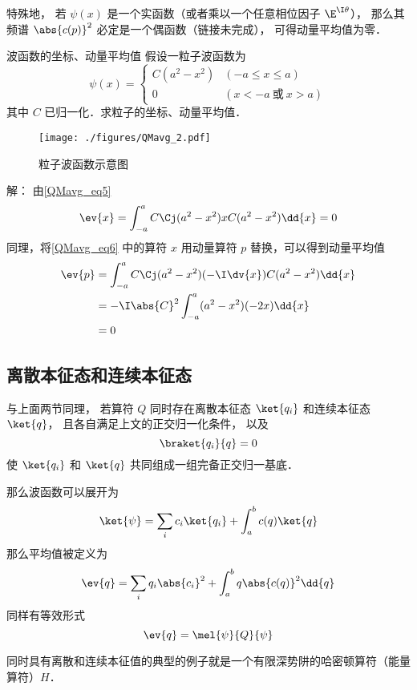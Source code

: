 特殊地， 若 $\psi(x)$ 是一个实函数（或者乘以一个任意相位因子 $\E^{\I \theta}$）， 那么其频谱 $\abs{c(p)}^2$ 必定是一个偶函数（链接未完成）， 可得动量平均值为零．


\begin{example}{波函数的坐标、动量平均值}
假设一粒子波函数为
\begin{equation}
\psi(x)=
\begin{cases}
C(a^2-x^2) &(-a\leqslant x\leqslant a)\\
0 &(x<-a \ \text{或}\ x>a) 
\end{cases}
\end{equation}
其中 $C$ 已归一化．求粒子的坐标、动量平均值．

\begin{figure}[ht]
\centering
\texttt{[image: ./figures/QMavg\_2.pdf]}
\caption{粒子波函数示意图} \label{QMavg_fig2}
\end{figure}

解： 由\autoref{QMavg_eq5} 
\begin{equation}\label{QMavg_eq6}
\ev{x}= \int_{-a}^a C\Cj(a^2-x^2)xC(a^2-x^2)\dd{x} = 0
\end{equation}
同理，将\autoref{QMavg_eq6} 中的算符 $x$ 用动量算符 $p$ 替换，可以得到动量平均值
\begin{equation}
\begin{aligned}
\ev{p} &= \int_{-a}^a C\Cj(a^2-x^2)(-\I\dv{x})C(a^2-x^2)\dd{x}\\
&= -\I\abs{C}^2\int_{-a}^a (a^2-x^2)(-2x)\dd{x}\\
&= 0
\end{aligned}
\end{equation}
\end{example}

\subsection{离散本征态和连续本征态}
与上面两节同理， 若算符 $Q$ 同时存在离散本征态 $\ket{q_i}$ 和连续本征态 $\ket{q}$， 且各自满足上文的正交归一化条件， 以及
\begin{equation}
\braket{q_i}{q} = 0
\end{equation}
使 $\ket{q_i}$ 和 $\ket{q}$ 共同组成一组完备正交归一基底．

那么波函数可以展开为
\begin{equation}
\ket{\psi} = \sum_i c_i \ket{q_i} + \int_a^b c(q) \ket{q}
\end{equation}
那么平均值被定义为
\begin{equation}
\ev{q} = \sum_i q_i \abs{c_i}^2 + \int_a^b q \abs{c(q)}^2 \dd{q}
\end{equation}
同样有等效形式
\begin{equation}
\ev{q} = \mel{\psi}{Q}{\psi}
\end{equation}

同时具有离散和连续本征值的典型的例子就是一个有限深势阱的哈密顿算符（能量算符）$H$．
